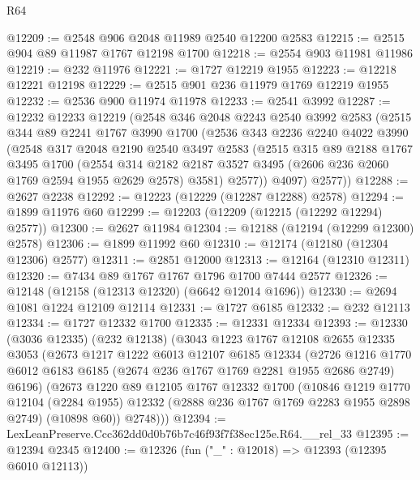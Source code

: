 \begin{lexlean}{R64}
\begin{coremodule}
@12209 := @2548 @906 @2048 @11989 @2540 @12200 @2583
@12215 := @2515 @904 @89 @11987 @1767 @12198 @1700
@12218 := @2554 @903 @11981 @11986
@12219 := @232 @11976
@12221 := @1727 @12219 @1955
@12223 := @12218 @12221 @12198
@12229 := @2515 @901 @236 @11979 @1769 @12219 @1955
@12232 := @2536 @900 @11974 @11978
@12233 := @2541 @3992
@12287 := @12232
    @12233
    @12219
    (@2548
      @346
      @2048
      @2243
      @2540
      @3992
      @2583
      (@2515
        @344
        @89
        @2241
        @1767
        @3990
        @1700
        (@2536
          @343
          @2236
          @2240
          @4022
          @3990
          (@2548
            @317
            @2048
            @2190
            @2540
            @3497
            @2583
            (@2515
              @315
              @89
              @2188
              @1767
              @3495
              @1700
              (@2554
                @314
                @2182
                @2187
                @3527
                @3495
                (@2606 @236 @2060 @1769 @2594 @1955 @2629 @2578)
                @3581)
              @2577))
          @4097)
        @2577))
@12288 := @2627 @2238
@12292 := @12223 (@12229 (@12287 @12288) @2578)
@12294 := @1899 @11976 @60
@12299 := @12203 (@12209 (@12215 (@12292 @12294) @2577))
@12300 := @2627 @11984
@12304 := @12188 (@12194 (@12299 @12300) @2578)
@12306 := @1899 @11992 @60
@12310 := @12174 (@12180 (@12304 @12306) @2577)
@12311 := @2851 @12000
@12313 := @12164 (@12310 @12311)
@12320 := @7434 @89 @1767 @1767 @1796 @1700 @7444 @2577
@12326 := @12148 (@12158 (@12313 @12320) (@6642 @12014 @1696))
@12330 := @2694 @1081 @1224 @12109 @12114
@12331 := @1727 @6185
@12332 := @232 @12113
@12334 := @1727 @12332 @1700
@12335 := @12331 @12334
@12393 := @12330
    (@3036 @12335)
    (@232 @12138)
    (@3043
      @1223
      @1767
      @12108
      @2655
      @12335
      @3053
      (@2673
        @1217
        @1222
        @6013
        @12107
        @6185
        @12334
        (@2726 @1216 @1770 @6012 @6183 @6185 (@2674 @236 @1767 @1769 @2281 @1955 @2686 @2749) @6196)
        (@2673
          @1220
          @89
          @12105
          @1767
          @12332
          @1700
          (@10846
            @1219
            @1770
            @12104
            (@2284 @1955)
            @12332
            (@2888 @236 @1767 @1769 @2283 @1955 @2898 @2749)
            (@10898 @60))
          @2748)))
@12394 := LexLeanPreserve.Ccc362dd0d0b76b7c46f93f7f38ec125e.R64.__rel_33
@12395 := @12394 @2345
@12400 := @12326 (fun ("_" : @12018) => @12393 (@12395 @6010 @12113))

\end{coremodule}
\end{lexlean}
